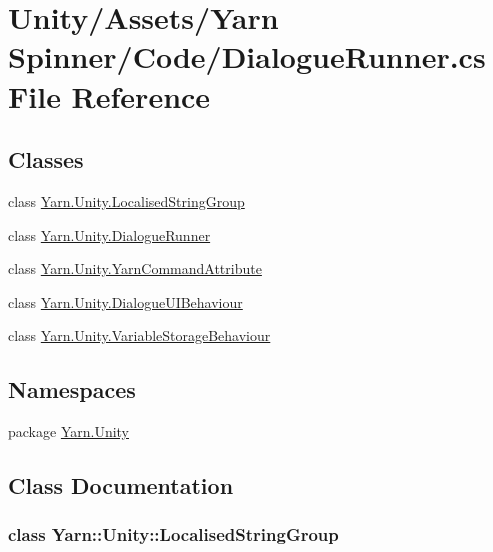 \hypertarget{a00253}{\section{Unity/\-Assets/\-Yarn Spinner/\-Code/\-Dialogue\-Runner.cs File Reference}
\label{a00253}
}
\subsection*{Classes}
\begin{DoxyCompactItemize}
\item 
class \hyperlink{a00109_de/dab/a00319}{Yarn.\-Unity.\-Localised\-String\-Group}
\item 
class \hyperlink{a00073}{Yarn.\-Unity.\-Dialogue\-Runner}
\item 
class \hyperlink{a00169}{Yarn.\-Unity.\-Yarn\-Command\-Attribute}
\item 
class \hyperlink{a00075}{Yarn.\-Unity.\-Dialogue\-U\-I\-Behaviour}
\item 
class \hyperlink{a00167}{Yarn.\-Unity.\-Variable\-Storage\-Behaviour}
\end{DoxyCompactItemize}
\subsection*{Namespaces}
\begin{DoxyCompactItemize}
\item 
package \hyperlink{a00109}{Yarn.\-Unity}
\end{DoxyCompactItemize}


\subsection{Class Documentation}
\label{de/dab/a00319}
\hypertarget{a00109_de/dab/a00319}{}
\subsubsection{class Yarn\-:\-:Unity\-:\-:Localised\-String\-Group}


